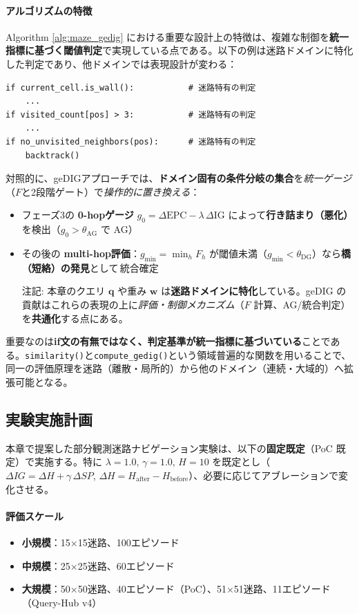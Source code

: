 \documentclass[ja=standard,xelatex]{bxjsarticle}
\begin{document}
\paragraph{アルゴリズムの特徴}
Algorithm \ref{alg:maze_gedig} における重要な設計上の特徴は、複雑な制御を\textbf{統一指標に基づく閾値判定}で実現している点である。以下の例は迷路ドメインに特化した判定であり、他ドメインでは表現設計が変わる：
\begin{verbatim}
if current_cell.is_wall():           # 迷路特有の判定
    ...
if visited_count[pos] > 3:           # 迷路特有の判定
    ...
if no_unvisited_neighbors(pos):      # 迷路特有の判定
    backtrack()
\end{verbatim}

対照的に、geDIGアプローチでは、\textbf{ドメイン固有の条件分岐の集合}を\emph{統一ゲージ}（$F$と2段階ゲート）で\emph{操作的に置き換える}：
\begin{itemize}
  \item フェーズ3の \textbf{0-hopゲージ} $g_0=\Delta\mathrm{EPC}-\lambda\,\Delta\mathrm{IG}$ によって\textbf{行き詰まり（悪化）}を検出（$g_0>\theta_{\mathrm{AG}}$ で AG）
  \item その後の \textbf{multi-hop評価}：$g_{\min}=\min_h F_h$ が閾値未満（$g_{\min}<\theta_{\mathrm{DG}}$）なら\textbf{橋（短絡）の発見}として\,統合確定

\noindent 注記: 本章のクエリ $\mathbf{q}$ や重み $\mathbf{w}$ は\textbf{迷路ドメインに特化}している。geDIG の貢献はこれらの表現の上に\emph{評価・制御メカニズム}（$F$ 計算、AG/統合判定）を\textbf{共通化}する点にある。
\end{itemize}

重要なのは\textbf{if文の有無ではなく、判定基準が統一指標に基づいている}ことである。\texttt{similarity()}と\texttt{compute\_gedig()}という領域普遍的な関数を用いることで、同一の評価原理を迷路（離散・局所的）から他のドメイン（連続・大域的）へ拡張可能となる。

\subsection{実験実施計画}

本章で提案した部分観測迷路ナビゲーション実験は、以下の\textbf{固定既定}（PoC 既定）で実施する。特に $\lambda{=}1.0,\,\gamma{=}1.0,\,H{=}10$ を既定とし（$\Delta IG{=}\Delta H{+}\gamma\,\Delta SP$, $\Delta H{=}H_{\mathrm{after}}{-}H_{\mathrm{before}}$）、必要に応じてアブレーションで変化させる。

\paragraph{評価スケール}
\begin{itemize}
  \item \textbf{小規模}：15×15迷路、100エピソード
  \item \textbf{中規模}：25×25迷路、60エピソード
  \item \textbf{大規模}：50×50迷路、40エピソード（PoC）、51×51迷路、11エピソード（Query-Hub v4）
\end{itemize}
\end{document}
